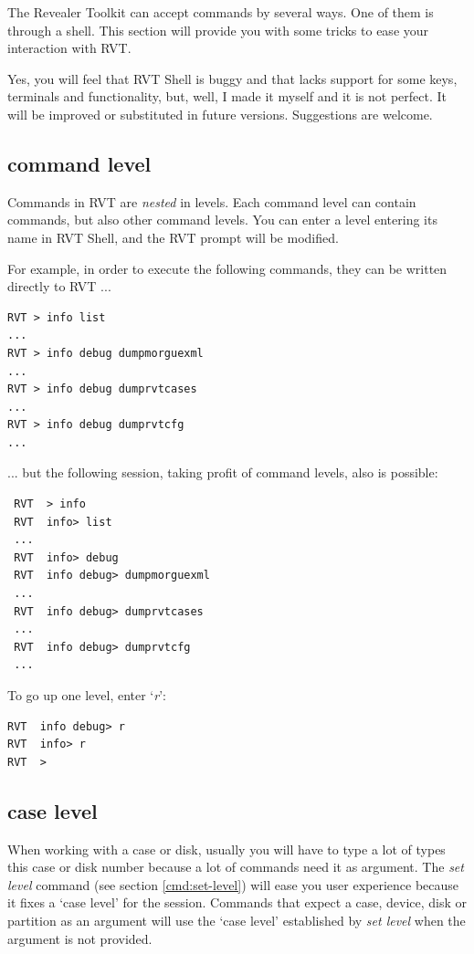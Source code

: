\documentclass[a4paper,11pt,oneside]{report}
\begin{document}
The Revealer Toolkit can accept commands by several ways. One of them is through a shell. This section will provide you with some tricks to ease your interaction with RVT.

Yes, you will feel that RVT Shell is buggy and that lacks support for some keys, terminals and functionality, but, well, I made it myself and it is not perfect. It will be improved or substituted in future versions. Suggestions are welcome.


\subsection{command level}

Commands in RVT are \emph{nested} in levels. Each command level can contain commands, but also other command levels. You can enter a level entering its name in RVT Shell, and the RVT prompt will be modified.

For example, in order to execute the following commands, they can be written directly to RVT ...

\begin{verbatim}
RVT > info list
...
RVT > info debug dumpmorguexml
...
RVT > info debug dumprvtcases
...
RVT > info debug dumprvtcfg
...
\end{verbatim}


... but the following session, taking profit of command levels, also is possible:

\begin{verbatim}
 RVT  > info 
 RVT  info> list
 ...  
 RVT  info> debug
 RVT  info debug> dumpmorguexml
 ...
 RVT  info debug> dumprvtcases
 ...
 RVT  info debug> dumprvtcfg
 ...
\end{verbatim}


To go up one level, enter `\emph{r}':

\begin{verbatim}
RVT  info debug> r
RVT  info> r
RVT  > 
\end{verbatim}


\subsection{case level}

When working with a case or disk, usually you will have to type a lot of types this case or disk number because a lot of commands need it as argument. The \emph{set level} command (see section \ref{cmd:set-level}) will ease you user experience because it fixes a `case level' for the session. Commands that expect a case, device, disk or partition as an argument will use the `case level' established by \emph{set level} when the argument is not provided. 
\end{document}
